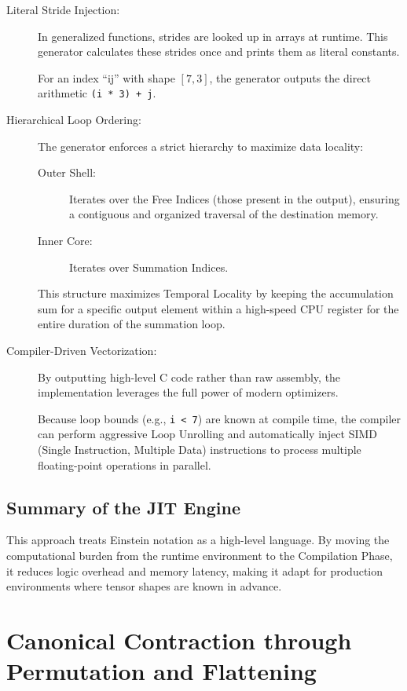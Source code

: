 \documentclass[binding=0.6cm]{sapthesis}
\begin{document}
\begin{description}
	\item [Literal Stride Injection:] In generalized functions, strides are looked up in arrays at runtime. This generator calculates these strides once and prints them as literal constants.

	      For an index ``ij'' with shape $[7, 3]$, the generator outputs the direct arithmetic \texttt{(i * 3) + j}.

	\item [Hierarchical Loop Ordering:] The generator enforces a strict hierarchy to maximize data locality:
	      \begin{description}
		      \item [Outer Shell:] Iterates over the Free Indices (those present in the output), ensuring a contiguous and organized traversal of the destination memory.
		      \item [Inner Core:] Iterates over Summation Indices.
	      \end{description}
	      This structure maximizes Temporal Locality by keeping the accumulation sum for a specific output element within a high-speed CPU register for the entire duration of the summation loop.

	\item [Compiler-Driven Vectorization:] By outputting high-level C code rather than raw assembly, the implementation leverages the full power of modern optimizers.

	      Because loop bounds (e.g., \texttt{i < 7}) are known at compile time, the compiler can perform aggressive Loop Unrolling and automatically inject SIMD (Single Instruction, Multiple Data) instructions to process multiple floating-point operations in parallel.
\end{description}

\subsection{Summary of the JIT Engine}

This approach treats Einstein notation as a high-level language. By moving the computational burden from the runtime environment to the Compilation Phase, it reduces logic overhead and memory latency, making it adapt for production environments where tensor shapes are known in advance.

\section{Canonical Contraction through Permutation and Flattening}
\label{sec:permute_flatten}
\end{document}

